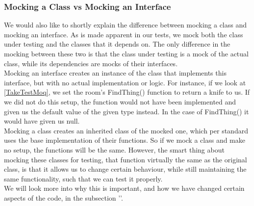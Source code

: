 \subsubsection{Mocking a Class vs Mocking an Interface} \label{MockingVsSection}
We would also like to shortly explain the difference between mocking a class and mocking an interface. As is made apparent in our tests, we mock both the class under testing and the classes that it depends on. The only difference in the mocking between these two is that the class under testing is a mock of the actual class, while its dependencies are mocks of their interfaces. \\
Mocking an interface creates an instance of the class that implements this interface, but with no actual implementation or logic. For instance, if we look at \autoref{TakeTestMoq}, we set the room's FindThing() function to return a knife to us. If we did not do this setup, the function would not have been implemented and given us the default value of the given type instead. In the case of FindThing() it would have given us null. \\
Mocking a class creates an inherited class of the mocked one, which per standard uses the base implementation of their functions. So if we mock a class and make no setup, the functions will be the same. However, the smart thing about mocking these classes for testing, that function virtually the same as the original class, is that it allows us to change certain behaviour, while still maintaining the same functionality, such that we can test it properly. \\
We will look more into why this is important, and how we have changed certain aspects of the code, in the subsection ''. 

